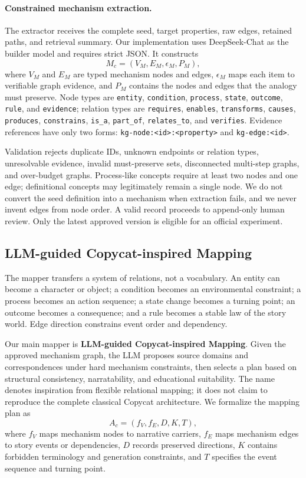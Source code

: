 \documentclass[letterpaper]{article} %
\begin{document}
\paragraph{Constrained mechanism extraction.}
The extractor receives the complete seed, target properties, raw edges, retained paths, and retrieval summary. Our implementation uses DeepSeek-Chat as the builder model and requires strict JSON. It constructs
\[
M_c=(V_M,E_M,\epsilon_M,P_M),
\]
where $V_M$ and $E_M$ are typed mechanism nodes and edges, $\epsilon_M$ maps each item to verifiable graph evidence, and $P_M$ contains the nodes and edges that the analogy must preserve. Node types are \texttt{entity}, \texttt{condition}, \texttt{process}, \texttt{state}, \texttt{outcome}, \texttt{rule}, and \texttt{evidence}; relation types are \texttt{requires}, \texttt{enables}, \texttt{transforms}, \texttt{causes}, \texttt{produces}, \texttt{constrains}, \texttt{is\_a}, \texttt{part\_of}, \texttt{relates\_to}, and \texttt{verifies}. Evidence references have only two forms: \texttt{kg-node:<id>:<property>} and \texttt{kg-edge:<id>}.

Validation rejects duplicate IDs, unknown endpoints or relation types, unresolvable evidence, invalid must-preserve sets, disconnected multi-step graphs, and over-budget graphs. Process-like concepts require at least two nodes and one edge; definitional concepts may legitimately remain a single node. We do not convert the seed definition into a mechanism when extraction fails, and we never invent edges from node order. A valid record proceeds to append-only human review. Only the latest approved version is eligible for an official experiment.

\subsection{LLM-guided Copycat-inspired Mapping}

The mapper transfers a system of relations, not a vocabulary. An entity can become a character or object; a condition becomes an environmental constraint; a process becomes an action sequence; a state change becomes a turning point; an outcome becomes a consequence; and a rule becomes a stable law of the story world. Edge direction constrains event order and dependency.

Our main mapper is \textbf{LLM-guided Copycat-inspired Mapping}. Given the approved mechanism graph, the LLM proposes source domains and correspondences under hard mechanism constraints, then selects a plan based on structural consistency, narratability, and educational suitability. The name denotes inspiration from flexible relational mapping; it does not claim to reproduce the complete classical Copycat architecture. We formalize the mapping plan as
\[
A_c=(f_V,f_E,D,K,T),
\]
where $f_V$ maps mechanism nodes to narrative carriers, $f_E$ maps mechanism edges to story events or dependencies, $D$ records preserved directions, $K$ contains forbidden terminology and generation constraints, and $T$ specifies the event sequence and turning point.
\end{document}
